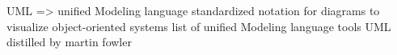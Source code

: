 UML =>  unified Modeling language 
  standardized notation for diagrams to visualize object-oriented systems 
  list of unified Modeling language tools 
  UML distilled by martin fowler